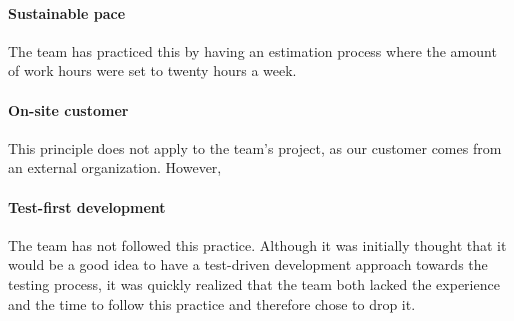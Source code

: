 \paragraph{Sustainable pace}
The team has practiced this by having an estimation process where the amount of work hours were set to twenty hours a week.

\paragraph{On-site customer}
This principle does not apply to the team's project, as our customer comes from an external organization. However,

\paragraph{Test-first development}
The team has not followed this practice. Although it was initially thought that it would be a good idea to have a test-driven development approach towards the testing process, it was quickly realized that the team both lacked the experience and the time to follow this practice and therefore chose to drop it.


